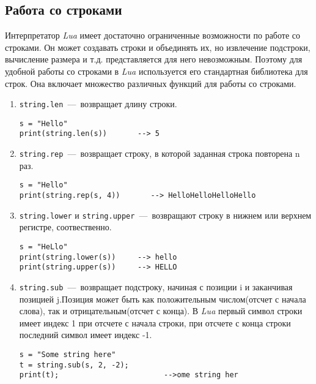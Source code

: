 \subsection{Работа со строками}

Интерпретатор \emph{Lua} имеет достаточно ограниченные возможности по работе со строками. Он может создавать строки и объединять их, но извлечение подстроки, вычисление размера и т.д. представляется для него невозможным. Поэтому для удобной работы со строками в \emph{Lua} используется его стандартная библиотека для строк. Она включает множество различных функций для работы со строками. 

\begin{enumerate}
	\item \lstinline{string.len}~---~возвращает длину строки.

\begin{lstlisting}
s = "Hello"
print(string.len(s))       --> 5
\end{lstlisting} 

	\item \lstinline{string.rep}~---~возвращает строку, в которой заданная строка повторена n раз.
	
\begin{lstlisting}
s = "Hello"
print(string.rep(s, 4))       --> HelloHelloHelloHello
\end{lstlisting} 

	\item \lstinline{string.lower} и \lstinline{string.upper}~---~возвращают строку в нижнем или верхнем регистре, соотвественно. 

\begin{lstlisting}
s = "HeLlo"
print(string.lower(s))     --> hello
print(string.upper(s))     --> HELLO
\end{lstlisting} 

	\item \lstinline{string.sub}~---~возвращает подстроку, начиная с позиции i и заканчивая позицией j.Позиция может быть как положительным числом(отсчет с начала слова),  так и отрицательным(отсчет с конца). В \emph{Lua} первый символ строки имеет индекс 1 при отсчете с начала строки, при отсчете с конца строки последний символ имеет индекс -1. 
	
\begin{lstlisting}
s = "Some string here"
t = string.sub(s, 2, -2);
print(t);                        -->ome string her
\end{lstlisting} 


\end{enumerate}
